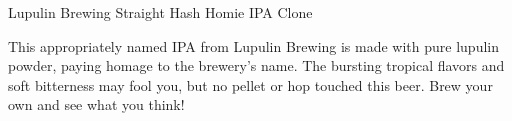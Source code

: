 \begin{recipie}{Lupulin Brewing Straight Hash Homie IPA Clone}

\begin{aboutblock}
This appropriately named IPA from Lupulin Brewing is made with pure lupulin
powder, paying homage to the brewery's name. The bursting tropical flavors and
soft bitterness may fool you, but no pellet or hop touched this beer. Brew your
own and see what you think! \sourceaha
\end{aboutblock}


\begin{methodandtiming}
 
\begin{mashsteps}
\end{mashsteps}

\begin{fermentationsteps}
\end{fermentationsteps}

\end{methodandtiming}

\pagebreak

\begin{ingredientsblock}

\begin{malts}
\end{malts}

\begin{hops}
\end{hops}


\end{ingredientsblock}

\end{recipie}

